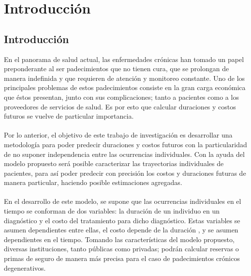 \chapter{Introducci\'on}
\section{Introducci\'on}
En el panorama de salud actual, las enfermedades cr\'onicas han tomado un papel preponderante al ser padecimientos que no tienen cura, que se prolongan de manera indefinida y que requieren de atenci\'on y monitoreo constante.  Uno de los principales problemas de estos padecimientos consiste en la gran carga econ\'omica que \'estos presentan, junto con sus complicaciones; tanto a pacientes como a los proveedores de servicios de salud. Es por esto que calcular duraciones y costos futuros se vuelve de particular importancia.\\
\\
Por lo anterior, el objetivo de este trabajo de investigaci\'on es desarrollar una metodolog\'ia para poder predecir duraciones y costos futuros con la particularidad de no suponer independencia entre las ocurrencias individuales. Con la ayuda del modelo propuesto ser\'a posible caracterizar las trayectorias individuales de pacientes, para as\'i poder predecir con precisi\'on los costos y duraciones futuras de manera particular, haciendo posible estimaciones agregadas.\\
\\
En el desarrollo de este modelo, se supone que las ocurrencias individuales en el tiempo se conforman de dos variables: la duraci\'on de un individuo en un diagn\'ostico y el costo del tratamiento para dicho diagn\'ostico. Estas variables se asumen dependientes entre ellas, el costo depende de la duraci\'on , y se asumen dependientes en el tiempo. Tomando las caracter\'isticas del modelo propuesto, diversas instituciones, tanto p\'ublicas como privadas; podr\'an calcular reservas o primas de seguro de manera m\'as precisa para el caso de padecimientos cr\'onicos degenerativos.\\
\\
